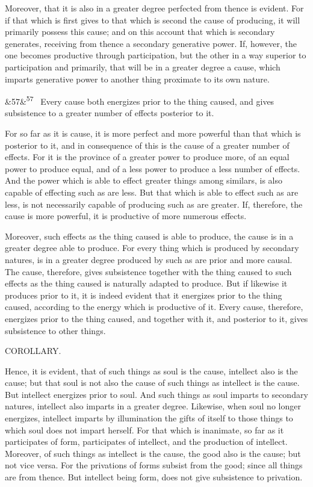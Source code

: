 \documentclass[12pt]{article}
\newcommand{\para}[1][]{\par\noindent\ifx&#1&\else\textsuperscript{\footnotesize #1}~\fi}
\begin{document}
Moreover, that it is also in a greater degree perfected from thence is evident. For if that which is first gives to that which is second the cause of producing, it will primarily possess this cause; and on this account that which is secondary generates, receiving from thence a secondary generative power. If, however, the one becomes productive through participation, but the other in a way superior to participation and primarily, that will be in a greater degree a cause, which imparts generative power to another thing proximate to its own nature.

\para[57] Every cause both energizes prior to the thing caused, and gives subsistence to a greater number of effects posterior to it.

For so far as it is cause, it is more perfect and more powerful than that which is posterior to it, and in consequence of this is the cause of a greater number of effects. For it is the province of a greater power to produce more, of an equal power to produce equal, and of a less power to produce a less number of effects. And the power which is able to effect greater things among similars, is also capable of effecting such as are less. But that which is able to effect such as are less, is not necessarily capable of producing such as are greater. If, therefore, the cause is more powerful, it is productive of more numerous effects.

Moreover, such effects as the thing caused is able to produce, the cause is in a greater degree able to produce. For every thing which is produced by secondary natures, is in a greater degree produced by such as are prior and more causal. The cause, therefore, gives subsistence together with the thing caused to such effects as the thing caused is naturally adapted to produce. But if likewise it produces prior to it, it is indeed evident that it energizes prior to the thing caused, according to the energy which is productive of it. Every cause, therefore, energizes prior to the thing caused, and together with it, and posterior to it, gives subsistence to other things.

COROLLARY.

Hence, it is evident, that of such things as soul is the cause, intellect also is the cause; but that soul is not also the cause of such things as intellect is the cause. But intellect energizes prior to soul. And such things as soul imparts to secondary natures, intellect also imparts in a greater degree. Likewise, when soul no longer energizes, intellect imparts by illumination the gifts of itself to those things to which soul does not impart herself. For that which is inanimate, so far as it participates of form, participates of intellect, and the production of intellect. Moreover, of such things as intellect is the cause, the good also is the cause; but not vice versa. For the privations of forms subsist from the good; since all things are from thence. But intellect being form, does not give subsistence to privation.
\end{document}
